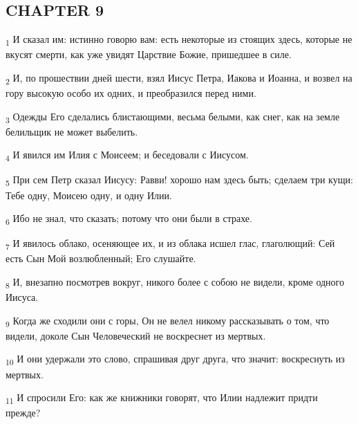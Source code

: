 \subsection{CHAPTER 9}
\begin{tcolorbox}
\textsubscript{1} И сказал им: истинно говорю вам: есть некоторые из стоящих здесь, которые не вкусят смерти, как уже увидят Царствие Божие, пришедшее в силе.
\end{tcolorbox}
\begin{tcolorbox}
\textsubscript{2} И, по прошествии дней шести, взял Иисус Петра, Иакова и Иоанна, и возвел на гору высокую особо их одних, и преобразился перед ними.
\end{tcolorbox}
\begin{tcolorbox}
\textsubscript{3} Одежды Его сделались блистающими, весьма белыми, как снег, как на земле белильщик не может выбелить.
\end{tcolorbox}
\begin{tcolorbox}
\textsubscript{4} И явился им Илия с Моисеем; и беседовали с Иисусом.
\end{tcolorbox}
\begin{tcolorbox}
\textsubscript{5} При сем Петр сказал Иисусу: Равви! хорошо нам здесь быть; сделаем три кущи: Тебе одну, Моисею одну, и одну Илии.
\end{tcolorbox}
\begin{tcolorbox}
\textsubscript{6} Ибо не знал, что сказать; потому что они были в страхе.
\end{tcolorbox}
\begin{tcolorbox}
\textsubscript{7} И явилось облако, осеняющее их, и из облака исшел глас, глаголющий: Сей есть Сын Мой возлюбленный; Его слушайте.
\end{tcolorbox}
\begin{tcolorbox}
\textsubscript{8} И, внезапно посмотрев вокруг, никого более с собою не видели, кроме одного Иисуса.
\end{tcolorbox}
\begin{tcolorbox}
\textsubscript{9} Когда же сходили они с горы, Он не велел никому рассказывать о том, что видели, доколе Сын Человеческий не воскреснет из мертвых.
\end{tcolorbox}
\begin{tcolorbox}
\textsubscript{10} И они удержали это слово, спрашивая друг друга, что значит: воскреснуть из мертвых.
\end{tcolorbox}
\begin{tcolorbox}
\textsubscript{11} И спросили Его: как же книжники говорят, что Илии надлежит придти прежде?
\end{tcolorbox}

